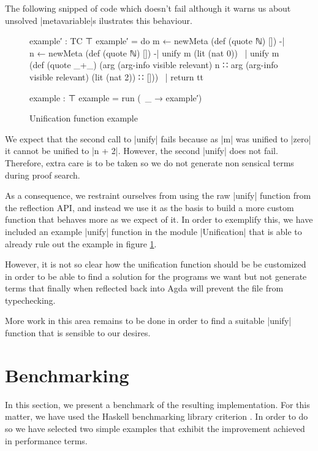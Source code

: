 \documentclass[a4paper]{article}
\begin{document}
The following snipped of code which doesn't fail although it warns us about
unsolved |metavariable|s ilustrates this behaviour.

\begin{figure}[h]
\small
\begin{code}
    example′ : TC ⊤
    example′ =
      do m ← newMeta (def (quote ℕ) [])
      -| n ← newMeta (def (quote ℕ) [])
      -| unify m (lit (nat 0))
      ~| unify m (def (quote _+_)
                 (arg (arg-info visible relevant) n ∷
                 arg (arg-info visible relevant) (lit (nat 2)) ∷ []))
      ~| return tt

    example : ⊤
    example = run (\ _ → example′)
\end{code}
  \label{fig:examplebad}
  \caption{Unification function example}
\end{figure}

We expect that the second call to |unify| fails because as |m| was unified to
|zero| it cannot be unified to |n + 2|. However, the second |unify| does not
fail. Therefore, extra care is to be taken so we do not generate non sensical
terms during proof search.

As a consequence, we restraint ourselves from using the raw |unify| function
from the reflection API, and instead we use it as the basis to build a more
custom function that behaves more as we expect of it. In order to exemplify
this, we have included an example |unify| function in the module |Unification|
that is able to already rule out the example in figure \ref{fig:examplebad}.

However, it is not so clear how the unification function should be be customized
in order to be able to find a solution for the programs we want but not generate
terms that finally when reflected back into Agda will prevent the file from
typechecking.

More work in this area remains to be done in order to find a suitable |unify|
function that is sensible to our desires.

\section{Benchmarking}
\label{sec:benchmark}

In this section, we present a benchmark of the resulting implementation. For
this matter, we have used the Haskell benchmarking library criterion
. In order to do so we
have selected two simple examples that exhibit the improvement achieved in
performance terms.
\end{document}
